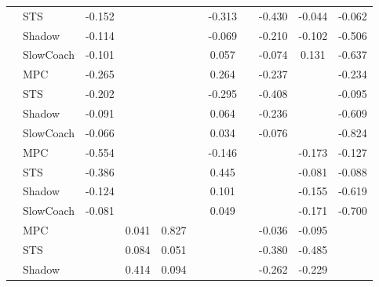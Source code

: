 \begin{tabular}{|l|l|*{9}{c|}}
                                                           & STS &   -0.152 &        &        &     & -0.313 &     &  -0.430 &  -0.044 &   -0.062 \\
                                                           & Shadow &   -0.114 &        &        &     & -0.069 &     &  -0.210 &  -0.102 &   -0.506 \\
                                                           & SlowCoach &   -0.101 &        &        &     &  0.057 &     &  -0.074 &   0.131 &   -0.637 \\
\midrule
[True, False, False, False, True, False, True, False, True] & MPC &   -0.265 &        &        &     &  0.264 &     &  -0.237 &      &   -0.234 \\
                                                           & STS &   -0.202 &        &        &     & -0.295 &     &  -0.408 &      &   -0.095 \\
                                                           & Shadow &   -0.091 &        &        &     &  0.064 &     &  -0.236 &      &   -0.609 \\
                                                           & SlowCoach &   -0.066 &        &        &     &  0.034 &     &  -0.076 &      &   -0.824 \\
\midrule
[True, False, False, False, True, False, False, True, True] & MPC &   -0.554 &        &        &     & -0.146 &     &      &  -0.173 &   -0.127 \\
                                                           & STS &   -0.386 &        &        &     &  0.445 &     &      &  -0.081 &   -0.088 \\
                                                           & Shadow &   -0.124 &        &        &     &  0.101 &     &      &  -0.155 &   -0.619 \\
                                                           & SlowCoach &   -0.081 &        &        &     &  0.049 &     &      &  -0.171 &   -0.700 \\
\midrule
[False, True, True, False, False, False, True, True, False] & MPC &       &     0.041 &     0.827 &     &     &     &  -0.036 &  -0.095 &       \\
                                                           & STS &       &     0.084 &     0.051 &     &     &     &  -0.380 &  -0.485 &       \\
                                                           & Shadow &       &     0.414 &     0.094 &     &     &     &  -0.262 &  -0.229 &       \\

\end{tabular}
